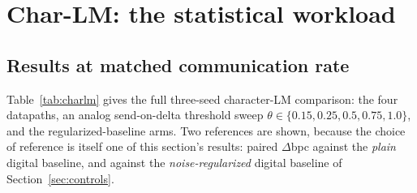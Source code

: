 
\section{Char-LM: the statistical workload}
\label{sec:charlm}

\subsection{Results at matched communication rate}
\label{sec:charlm-matched}

Table~\ref{tab:charlm} gives the full three-seed character-LM comparison: the four datapaths,
an analog send-on-delta threshold sweep $\theta \in \{0.15, 0.25, 0.5, 0.75, 1.0\}$, and the
regularized-baseline arms. Two references are shown, because the choice of reference is itself
one of this section's results: paired $\Delta$bpc against the \emph{plain} digital baseline,
and against the \emph{noise-regularized} digital baseline of Section~\ref{sec:controls}.

